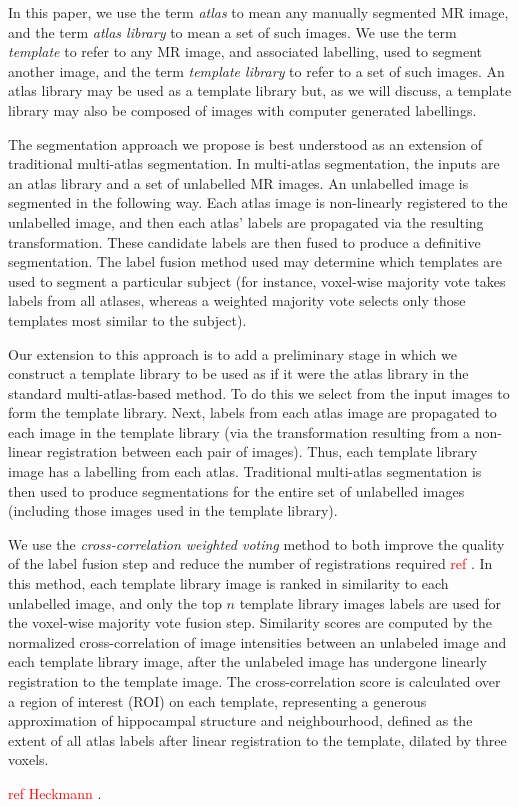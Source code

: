 \documentclass{article}
\newcommand{\todo}[1]{
    \textcolor{red}{#1}
}
\begin{document}
In this paper, we use the term {\it atlas} to mean any manually segmented MR
image, and the term {\it atlas library} to mean a set of such images.  We use
the term {\it template} to refer to any MR image, and associated labelling,
used to segment another image, and the term {\it template library} to refer to
a set of such images.  An atlas library may be used as a template library but,
as we will discuss, a template library may also be composed of images with
computer generated labellings. 

The segmentation approach we propose is best understood as an extension of
traditional multi-atlas segmentation.  In multi-atlas segmentation, the inputs
are an atlas library and a set of unlabelled MR images.  An unlabelled image is
segmented in the following way.  Each atlas image is non-linearly registered to
the unlabelled image, and then each atlas' labels are propagated via the
resulting transformation.  These candidate labels are then fused to produce a
definitive segmentation. The label fusion method used may determine which
templates are used to segment a particular subject (for instance, voxel-wise
majority vote takes labels from all atlases, whereas a weighted majority vote
selects only those templates most similar to the subject). 

Our extension to this approach is to add a preliminary stage in which we
construct a template library to be used as if it were the atlas library
in the standard multi-atlas-based method.  To do this we select from the
input images to form the template library.  Next, labels from each atlas
image are propagated to each image in the template library (via the
transformation resulting from a non-linear registration between each pair
of images).  Thus, each template library image has a labelling from each
atlas.  Traditional multi-atlas segmentation is then used to produce
segmentations for the entire set of unlabelled images (including those
images used in the template library). 

We use the {\it cross-correlation weighted voting} method to both improve the
quality of the label fusion step and reduce the number of registrations
required \todo{ref}.  In this method, each template library image is ranked 
in similarity to each unlabelled image, and only the top $n$ template library
images labels are used for the voxel-wise majority vote fusion step.
Similarity scores are computed by the normalized cross-correlation of image
intensities between an unlabeled image and each template library image, after
the unlabeled image has undergone linearly registration to the template image.
The cross-correlation score is calculated over a region of interest (ROI)
on each template, representing a generous approximation of hippocampal
structure and neighbourhood, defined as the extent of all atlas labels
after linear registration to the template, dilated by three voxels.
\todo{ref Heckmann}. 
\end{document}

